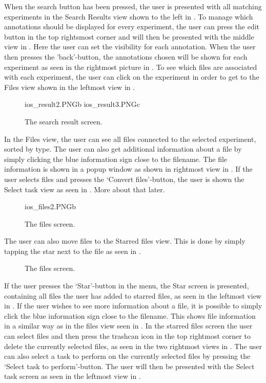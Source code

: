 When the search button has been pressed, the user is presented with all matching experiments in the Search Results view shown to the left in . To manage which annotations should be displayed for every experiment, the user can press the edit button in the top rightsmost corner and will then be presented with the middle view in . Here the user can set the visibility for each annotation. When the user then presses the ’back’-button, the annotations chosen will be shown for each experiment as seen in the rightmost picture in . To see which files are associated with each experiment, the user can click on the experiment in order to get to the Files view shown in the leftmost view in .

\begin{figure}[ht]

		{ios_result2.PNG}{b}
		{ios_result3.PNG}{c}
\caption{The search result screen.}
\label{fig:ios_searchResult}
\end{figure}
\FloatBarrier
In the Files view, the user can see all files connected to the selected experiment, sorted by type. The user can also get additional information about a file by simply clicking the blue information sign close to the filename. The file information is shown in a popup window as shown in rightmost view in . If the user selects files and presses the ‘Convert files’-button, the user is shown the Select task view as seen in . More about that later.

\begin{figure}[htb]
		{ios_files2.PNG}{b}

\caption{The files screen.}
\label{fig:ios_files1}
\end{figure}
\FloatBarrier
The user can also move files to the Starred files view. This is done by simply tapping the star next to the file as seen in .

\begin{figure}[htb]
\caption{The files screen.}
\label{fig:ios_files3}
\end{figure}
\FloatBarrier

If the user presses the ‘Star’-button in the menu, the Star screen is presented, containing all files the user has added to starred files, as seen in the leftmost view in . If the user wishes to see more information about a file, it is possible to simply click the blue information sign close to the filename. This shows file information in a similar way as in the files view seen in . In the starred files screen the user can select files and then press the trashcan icon in the top rightmost corner to delete the currently selected files, as seen in the two rightmost views in . The user can also select a task to perform on the currently selected files by pressing the ‘Select task to perform’-button. The user will then be presented with the Select task screen as seen in the leftmost view in .

